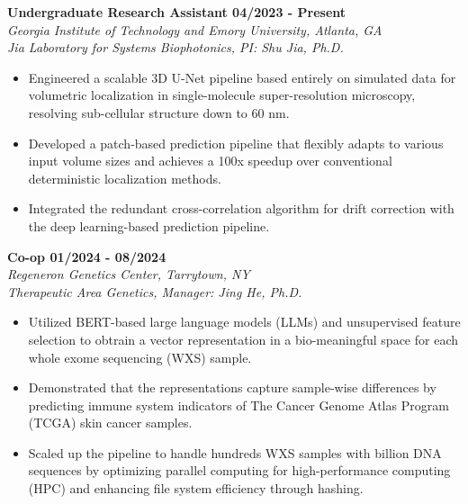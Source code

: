 \documentclass[letterpaper, 11pt]{article}
\newcommand{\subsectionvspace}{\vspace{8pt}}
\begin{document}
    \textbf{Undergraduate Research Assistant \hfill 04/2023 - Present} \\
    \textit{Georgia Institute of Technology and Emory University, Atlanta, GA} \\
    \textit{Jia Laboratory for Systems Biophotonics, PI: Shu Jia, Ph.D.}
    \begin{itemize}
        \item Engineered a scalable 3D U-Net pipeline based entirely on simulated data for volumetric localization in single-molecule super-resolution microscopy, resolving sub-cellular structure down to 60 nm.
        \item Developed a patch-based prediction pipeline that flexibly adapts to various input volume sizes and achieves a 100x speedup over conventional deterministic localization methods.
        \item Integrated the redundant cross-correlation algorithm for drift correction with the deep learning-based prediction pipeline.
    \end{itemize}

    \subsectionvspace

    \textbf{Co-op \hfill 01/2024 - 08/2024} \\
    \textit{Regeneron Genetics Center, Tarrytown, NY} \\
    \textit{Therapeutic Area Genetics, Manager: Jing He, Ph.D.}
    \begin{itemize}
        \item Utilized BERT-based large language models (LLMs) and unsupervised feature selection to obtrain a vector representation in a bio-meaningful space for each whole exome sequencing (WXS) sample.
        \item Demonstrated that the representations capture sample-wise differences by predicting immune system indicators of The Cancer Genome Atlas Program (TCGA) skin cancer samples.
        \item Scaled up the pipeline to handle hundreds WXS samples with billion DNA sequences by optimizing parallel computing for high-performance computing (HPC) and enhancing file system efficiency through hashing.
    \end{itemize}

    \subsectionvspace
\end{document}
